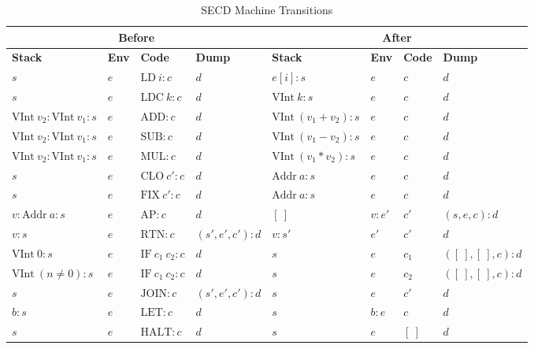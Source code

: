 \begin{table}[h]
    \centering
    \small
    \setlength{\tabcolsep}{4pt}
    \begin{tabular}{|l|l|l|l||l|l|l|l|}
        \hline
        \multicolumn{4}{|c||}{\textbf{Before}} & \multicolumn{4}{c|}{\textbf{After}} \\
        \hline
        \textbf{Stack} & \textbf{Env} & \textbf{Code} & \textbf{Dump} & \textbf{Stack} & \textbf{Env} & \textbf{Code} & \textbf{Dump} \\
        \hline
        \( s \) & \( e \) & \( \text{LD} \ i : c \) & \( d \) & \( e[i] : s \) & \( e \) & \( c \) & \( d \) \\
        \( s \) & \( e \) & \( \text{LDC} \ k : c \) & \( d \) & \( \text{VInt} \ k : s \) & \( e \) & \( c \) & \( d \) \\
        \( \text{VInt} \ v_2 : \text{VInt} \ v_1 : s \) & \( e \) & \( \text{ADD} : c \) & \( d \) & \( \text{VInt} \ (v_1 + v_2) : s \) & \( e \) & \( c \) & \( d \) \\
        \( \text{VInt} \ v_2 : \text{VInt} \ v_1 : s \) & \( e \) & \( \text{SUB} : c \) & \( d \) & \( \text{VInt} \ (v_1 - v_2) : s \) & \( e \) & \( c \) & \( d \) \\
        \( \text{VInt} \ v_2 : \text{VInt} \ v_1 : s \) & \( e \) & \( \text{MUL} : c \) & \( d \) & \( \text{VInt} \ (v_1 * v_2) : s \) & \( e \) & \( c \) & \( d \) \\
        \hline
        \( s \) & \( e \) & \( \text{CLO} \ c' : c \) & \( d \) & \( \text{Addr} \ a : s \) & \( e \) & \( c \) & \( d \) \\
        \( s \) & \( e \) & \( \text{FIX} \ c' : c \) & \( d \) & \( \text{Addr} \ a : s \) & \( e \) & \( c \) & \( d \) \\
        \( v : \text{Addr} \ a : s \) & \( e \) & \( \text{AP} : c \) & \( d \) & \( [ \ ] \) & \( v : e' \) & \( c' \) & \( (s, e, c) : d \) \\
        \( v : s \) & \( e \) & \( \text{RTN} : c \) & \( (s', e', c') : d \) & \( v : s' \) & \( e' \) & \( c' \) & \( d \) \\
        \hline
        \( \text{VInt} \ 0 : s \) & \( e \) & \( \text{IF} \ c_1 \ c_2 : c \) & \( d \) & \( s \) & \( e \) & \( c_1 \) & \( ([ \ ], [ \ ], c) : d \) \\
        \( \text{VInt} \ (n \neq 0) : s \) & \( e \) & \( \text{IF} \ c_1 \ c_2 : c \) & \( d \) & \( s \) & \( e \) & \( c_2 \) & \( ([\ ], [ \ ], c) : d \) \\
        \( s \) & \( e \) & \( \text{JOIN} : c \) & \( (s', e', c') : d \) & \( s \) & \( e \) & \( c' \) & \( d \) \\
        \( b : s \) & \( e \) & \( \text{LET} : c \) & \( d \) & \( s \) & \( b : e \) & \( c \) & \( d \) \\
        \( s \) & \( e \) & \( \text{HALT} : c \) & \( d \) & \( s \) & \( e \) & \( [ \ ] \) & \( d \) \\
        \hline
    \end{tabular}
    \caption{SECD Machine Transitions}
    \label{table:secd}
\end{table}

